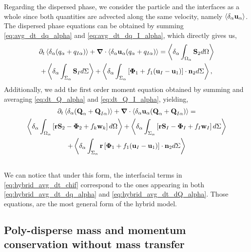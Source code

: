 Regarding the dispersed phase, we consider the particle and the interfaces as a whole since both quantities are advected along the same velocity, namely $\left<\delta_\alpha \textbf{u}_\alpha\right>$.
The dispersed phase equations can be obtained by summing \ref{eq:avg_dt_dq_alpha} and \ref{eq:avg_dt_dq_I_alpha}, which directly gives us, 
\begin{multline}
    \partial_t \left<\delta_\alpha (q_\alpha+q_{I\alpha})\right>
    + \bm{\nabla} \cdot\left<\delta_\alpha \textbf{u}_\alpha (q_\alpha+q_{I\alpha})\right>
    = \left<\delta_\alpha \int_{\Omega_\alpha} \textbf{S}_2 d\Omega\right>\\
    + \left<\delta_\alpha \int_{\Sigma_\alpha} \textbf{S}_I d\Sigma\right>
    + \left<\delta_\alpha \int_{\Sigma_\alpha} \left[\bm{\Phi}_1 + f_1 (\textbf{u}_I-\textbf{u}_1) \right] \cdot \textbf{n}_2 d\Sigma\right>,
    \label{eq:hybrid_avg_dt_dq_alpha}\\
\end{multline}
Additionally, we add the first order moment equation obtained by summing and averaging \ref{eq:dt_Q_alpha} and \ref{eq:dt_Q_I_alpha}, yielding,
\begin{multline}
    \partial_t \left<\delta_\alpha (\textbf{Q}_\alpha+\textbf{Q}_{I\alpha})\right>
    + \bm{\nabla}\cdot \left<\delta_\alpha   \textbf{u}_\alpha (\textbf{Q}_\alpha+ \textbf{Q}_{I\alpha})\right>
    =\\ \left<\delta_\alpha \int_{\Omega_\alpha} \left[
        \textbf{r}\textbf{S}_2
        - \mathbf{\Phi}_2
        + f_k\textbf{w}_k
        \right] d\Omega\right>
    + \left<\delta_\alpha \int_{\Sigma_\alpha} \left[
        \textbf{r}\textbf{S}_I
        - \mathbf{\Phi}_I
        + f_I\textbf{w}_I
    \right] d\Sigma\right>\\
    + \left<\delta_\alpha \int_{\Sigma_\alpha} \textbf{r}\left[\bm{\Phi}_1 + f_1 (\textbf{u}_I-\textbf{u}_1) \right] \cdot \textbf{n}_2 d\Sigma\right>\\
    \label{eq:hybrid_avg_dt_dQ_alpha}\\
\end{multline}
We can notice that under this form, the interfacial terms in \ref{eq:hybrid_avg_dt_chif} correspond to the ones appearing in both \ref{eq:hybrid_avg_dt_dq_alpha} and \ref{eq:hybrid_avg_dt_dQ_alpha}.
Those equations, are the most general form of the hybrid model. 

\subsection{Poly-disperse mass and momentum conservation without mass transfer}

